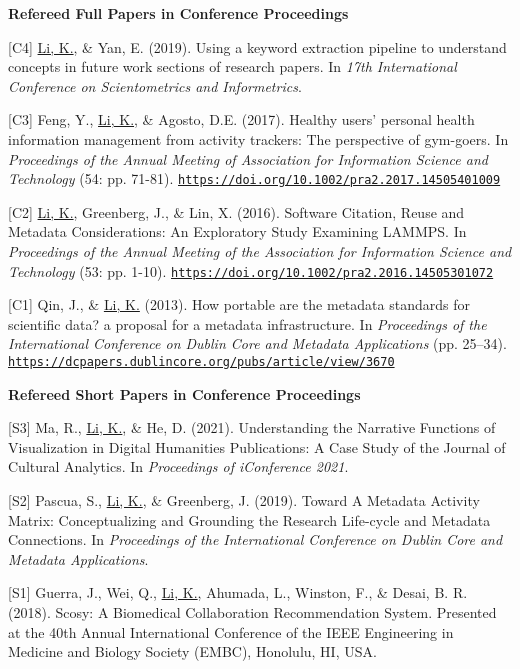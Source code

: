 \documentclass[margin, 10pt]{res} %
\begin{document}
\begin{resume}
\textbf{Refereed Full Papers in Conference Proceedings}

[C4] \underline{Li, K.}, \& Yan, E. (2019). Using a keyword extraction pipeline to understand concepts in future work sections of research papers. In \textit{17th International Conference on Scientometrics and Informetrics}.

[C3] Feng, Y., \underline{Li, K.}, \& Agosto, D.E. (2017). Healthy users’ personal health information management from activity trackers: The perspective of gym-goers. In \textit{Proceedings of the Annual Meeting of Association for Information Science and Technology} (54: pp. 71-81). \href{https://doi.org/10.1002/pra2.2017.14505401009}{\nolinkurl{https://doi.org/10.1002/pra2.2017.14505401009}}

[C2] \underline{Li, K.}, Greenberg, J., \& Lin, X. (2016). Software Citation, Reuse and Metadata Considerations: An Exploratory Study Examining LAMMPS. In \textit{Proceedings of the Annual Meeting of the Association for Information Science and Technology} (53: pp. 1-10). \href{https://doi.org/10.1002/pra2.2016.14505301072}{\nolinkurl{https://doi.org/10.1002/pra2.2016.14505301072}}

[C1] Qin, J., \& \underline{Li, K.} (2013). How portable are the metadata standards for scientific data? a proposal for a metadata infrastructure. In \textit{Proceedings of the International Conference on Dublin Core and Metadata Applications} (pp. 25–34). \href{https://dcpapers.dublincore.org/pubs/article/view/3670}{\nolinkurl{https://dcpapers.dublincore.org/pubs/article/view/3670}}

\textbf{Refereed Short Papers in Conference Proceedings}

[S3] Ma, R., \underline{Li, K.}, \& He, D. (2021). Understanding the Narrative Functions of Visualization in Digital Humanities Publications: A Case Study of the Journal of Cultural Analytics. In \textit{Proceedings of iConference 2021}.

[S2] Pascua, S., \underline{Li, K.}, \& Greenberg, J. (2019). Toward A Metadata Activity Matrix: Conceptualizing and Grounding the Research Life-cycle and Metadata Connections. In \textit{Proceedings of the International Conference on Dublin Core and Metadata Applications}.

[S1] Guerra, J., Wei, Q., \underline{Li, K.}, Ahumada, L., Winston, F., \& Desai, B. R. (2018). Scosy: A Biomedical Collaboration Recommendation System. Presented at the 40th Annual International Conference of the IEEE Engineering in Medicine and Biology Society (EMBC), Honolulu, HI, USA.


\end{resume}
\end{document}
